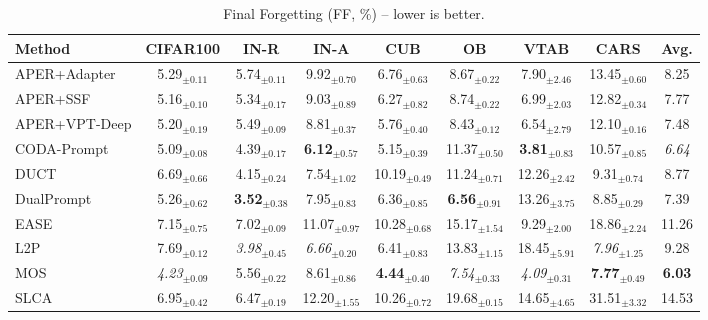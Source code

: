 \begin{table}[!t]
\begin{subtable}{\textwidth}
  \centering
  \caption{Final Forgetting (FF, \%) -- lower is better.}
  \label{tab:overall-ff}
  \renewcommand{\arraystretch}{0.95}
\begin{adjustbox}{max width=\textwidth}
\footnotesize
\begin{tabular}{l c c c c c c c c}
\toprule
Method & \textbf{CIFAR100} & \textbf{IN-R} & \textbf{IN-A} & \textbf{CUB} & \textbf{OB} & \textbf{VTAB} & \textbf{CARS} & \textbf{Avg.} \\
\midrule
APER+Adapter & 5.29$_{\pm 0.11}$ & 5.74$_{\pm 0.11}$ & 9.92$_{\pm 0.70}$ & 6.76$_{\pm 0.63}$ & 8.67$_{\pm 0.22}$ & 7.90$_{\pm 2.46}$ & 13.45$_{\pm 0.60}$ & 8.25 \\
APER+SSF & 5.16$_{\pm 0.10}$ & 5.34$_{\pm 0.17}$ & 9.03$_{\pm 0.89}$ & 6.27$_{\pm 0.82}$ & 8.74$_{\pm 0.22}$ & 6.99$_{\pm 2.03}$ & 12.82$_{\pm 0.34}$ & 7.77 \\
APER+VPT-Deep & 5.20$_{\pm 0.19}$ & 5.49$_{\pm 0.09}$ & 8.81$_{\pm 0.37}$ & 5.76$_{\pm 0.40}$ & 8.43$_{\pm 0.12}$ & 6.54$_{\pm 2.79}$ & 12.10$_{\pm 0.16}$ & 7.48 \\
CODA-Prompt & 5.09$_{\pm 0.08}$ & 4.39$_{\pm 0.17}$ & \textbf{6.12}$_{\pm 0.57}$ & 5.15$_{\pm 0.39}$ & 11.37$_{\pm 0.50}$ & \textbf{3.81}$_{\pm 0.83}$ & 10.57$_{\pm 0.85}$ & \textit{6.64} \\
DUCT & 6.69$_{\pm 0.66}$ & 4.15$_{\pm 0.24}$ & 7.54$_{\pm 1.02}$ & 10.19$_{\pm 0.49}$ & 11.24$_{\pm 0.71}$ & 12.26$_{\pm 2.42}$ & 9.31$_{\pm 0.74}$ & 8.77 \\
DualPrompt & 5.26$_{\pm 0.62}$ & \textbf{3.52}$_{\pm 0.38}$ & 7.95$_{\pm 0.83}$ & 6.36$_{\pm 0.85}$ & \textbf{6.56}$_{\pm 0.91}$ & 13.26$_{\pm 3.75}$ & 8.85$_{\pm 0.29}$ & 7.39 \\
EASE & 7.15$_{\pm 0.75}$ & 7.02$_{\pm 0.09}$ & 11.07$_{\pm 0.97}$ & 10.28$_{\pm 0.68}$ & 15.17$_{\pm 1.54}$ & 9.29$_{\pm 2.00}$ & 18.86$_{\pm 2.24}$ & 11.26 \\
L2P & 7.69$_{\pm 0.12}$ & \textit{3.98}$_{\pm 0.45}$ & \textit{6.66}$_{\pm 0.20}$ & 6.41$_{\pm 0.83}$ & 13.83$_{\pm 1.15}$ & 18.45$_{\pm 5.91}$ & \textit{7.96}$_{\pm 1.25}$ & 9.28 \\
MOS & \textit{4.23}$_{\pm 0.09}$ & 5.56$_{\pm 0.22}$ & 8.61$_{\pm 0.86}$ & \textbf{4.44}$_{\pm 0.40}$ & \textit{7.54}$_{\pm 0.33}$ & \textit{4.09}$_{\pm 0.31}$ & \textbf{7.77}$_{\pm 0.49}$ & \textbf{6.03} \\
SLCA & 6.95$_{\pm 0.42}$ & 6.47$_{\pm 0.19}$ & 12.20$_{\pm 1.55}$ & 10.26$_{\pm 0.72}$ & 19.68$_{\pm 0.15}$ & 14.65$_{\pm 4.65}$ & 31.51$_{\pm 3.32}$ & 14.53 \\

\end{tabular}
\end{adjustbox}
\end{subtable}
\end{table}
